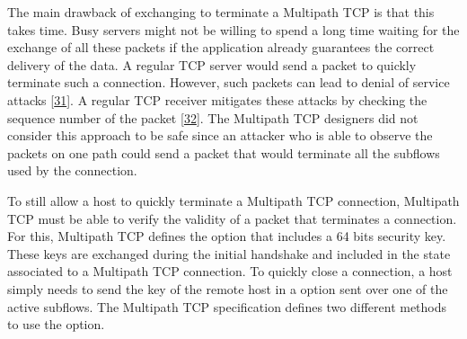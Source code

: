 \documentclass[letterpaper,10pt,english]{sphinxmanual}
\begin{document}
\sphinxAtStartPar
The main drawback of exchanging  to terminate a Multipath TCP is that this takes time. Busy servers might not be willing to spend a long time waiting for the exchange of all these packets if the application already guarantees the correct delivery of the data. A regular TCP server would send a  packet to quickly terminate such a connection. However, such  packets can lead to denial of service attacks {[}\hyperlink{cite.biblio:id5818}{31}{]}. A regular TCP receiver mitigates these attacks by checking the sequence number of the  packet {[}\hyperlink{cite.biblio:id5558}{32}{]}. The Multipath TCP designers did not consider this approach to be safe since an attacker who is able to observe the packets on one path could send a  packet that would terminate all the subflows used by the connection.

\sphinxAtStartPar
To still allow a host to quickly terminate a Multipath TCP connection, Multipath TCP must be able to verify the validity of a packet that terminates a connection. For this, Multipath TCP defines the  option that includes a 64 bits security key. These keys are exchanged during the initial handshake and included in the state associated to a Multipath TCP connection. To quickly close a connection, a host simply needs to send the key of the remote host in a  option sent over one of the active subflows. The Multipath TCP specification defines two different methods to use the  option.
\end{document}
